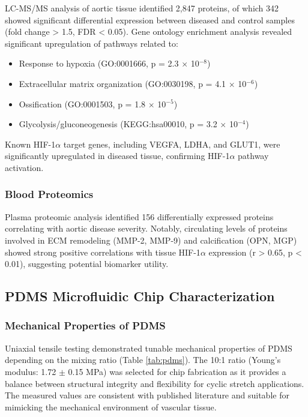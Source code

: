 \documentclass[materials,article,submit,moreauthors,pdftex]{Definitions/mdpi}
\begin{document}
LC-MS/MS analysis of aortic tissue identified 2,847 proteins, of which 342 showed significant differential expression between diseased and control samples (fold change > 1.5, FDR < 0.05). Gene ontology enrichment analysis revealed significant upregulation of pathways related to:

\begin{itemize}
    \item Response to hypoxia (GO:0001666, p = 2.3 $\times$ 10$^{-8}$)
    \item Extracellular matrix organization (GO:0030198, p = 4.1 $\times$ 10$^{-6}$)
    \item Ossification (GO:0001503, p = 1.8 $\times$ 10$^{-5}$)
    \item Glycolysis/gluconeogenesis (KEGG:hsa00010, p = 3.2 $\times$ 10$^{-4}$)
\end{itemize}

Known HIF-1$\alpha$ target genes, including VEGFA, LDHA, and GLUT1, were significantly upregulated in diseased tissue, confirming HIF-1$\alpha$ pathway activation.

\subsubsection{Blood Proteomics}

Plasma proteomic analysis identified 156 differentially expressed proteins correlating with aortic disease severity. Notably, circulating levels of proteins involved in ECM remodeling (MMP-2, MMP-9) and calcification (OPN, MGP) showed strong positive correlations with tissue HIF-1$\alpha$ expression (r > 0.65, p < 0.01), suggesting potential biomarker utility.

\subsection{PDMS Microfluidic Chip Characterization}

\subsubsection{Mechanical Properties of PDMS}

Uniaxial tensile testing demonstrated tunable mechanical properties of PDMS depending on the mixing ratio (Table \ref{tab:pdms}). The 10:1 ratio (Young's modulus: 1.72 $\pm$ 0.15 MPa) was selected for chip fabrication as it provides a balance between structural integrity and flexibility for cyclic stretch applications. The measured values are consistent with published literature and suitable for mimicking the mechanical environment of vascular tissue.
\end{document}

